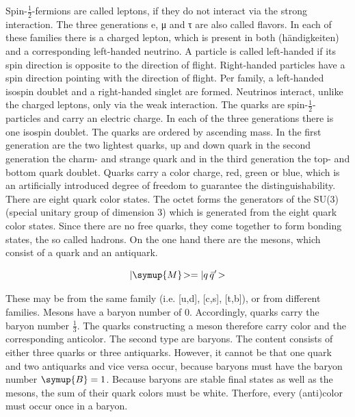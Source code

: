 Spin-$\frac{1}{2}$-fermions are called leptons, if they do not interact via the strong interaction. The three generations e, μ and τ are also called flavors.
In each of these families there is a charged lepton, which is present in both (h\"andigkeiten) and a corresponding left-handed neutrino. A particle
is called left-handed if its spin direction is opposite to the direction of flight.
Right-handed particles have a spin direction pointing with the direction of flight. Per
family, a left-handed isospin doublet and a right-handed singlet are formed.
Neutrinos interact, unlike the charged leptons, only via the weak
interaction.
The quarks are spin-$\frac{1}{2}$-particles and carry an electric charge. In each of the
three generations there is one isospin doublet. The quarks are ordered by ascending
mass. In the first generation are the two lightest quarks,
up and down quark in the second generation the charm- and strange quark and
in the third generation the top- and bottom quark doublet.
Quarks carry a color charge, red, green or blue, which is an artificially introduced degree of freedom to guarantee the distinguishability. There are eight
quark color states.
The octet forms the generators of the SU(3) (special unitary group of dimension
3) which is generated from the eight quark color states.
Since there are no free quarks, they come together to form bonding states, the
so called hadrons. On the one hand there are the mesons, which consist of a quark
and an antiquark.

\begin{equation}
	|\symup{M}\!> = | q\, \bar{q}'\!>
\end{equation}

These may be from the same family (i.e. [u,d], [c,s], [t,b]), or from
different families. Mesons have a baryon number of 0. Accordingly, quarks carry the baryon number $\frac{1}{3}$. The quarks constructing a meson therefore carry color and the corresponding anticolor.
The second type are baryons. The content consists of either three quarks or
three antiquarks. However, it cannot be that one quark and two antiquarks
and vice versa occur, because baryons must have the baryon number $\symup{B} = 1$. Because baryons are stable final states as well as the mesons, the sum of their quark colors must be white. Therfore, every (anti)color must occur once in a baryon.

